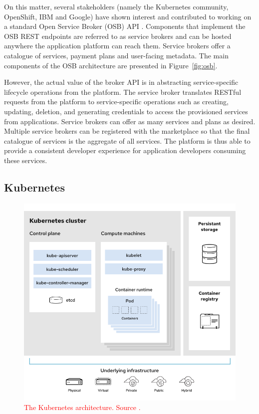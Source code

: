 On this matter, several stakeholders (namely the Kubernetes community, OpenShift, IBM and Google) have shown interest and contributed to working on a standard Open Service Broker (OSB) API \cite{osb}. Components that implement the OSB REST endpoints are referred to as service brokers and can be hosted anywhere the application platform can reach them. Service brokers offer a catalogue of services, payment plans and user-facing metadata. The main components of the OSB architecture are presented in Figure~\ref{fig:osb}.

However, the actual value of the broker API is in abstracting service-specific lifecycle operations from the platform. The service broker translates RESTful requests from the platform to service-specific operations such as creating, updating, deletion, and generating credentials to access the provisioned services from applications. Service brokers can offer as many services and plans as desired. Multiple service brokers can be registered with the marketplace so that the final catalogue of services is the aggregate of all services. The platform is thus able to provide a consistent developer experience for application developers consuming these services.

\subsection{Kubernetes}
\label{sec:kubernetes}

\begin{figure}[ht]
\centering
\includegraphics[width=\columnwidth]{figures/kubernetes}
\caption{\textcolor{red}{The Kubernetes architecture. Source \cite{k8s-architecture}.}}
\label{fig:kubernetes}
\end{figure}

